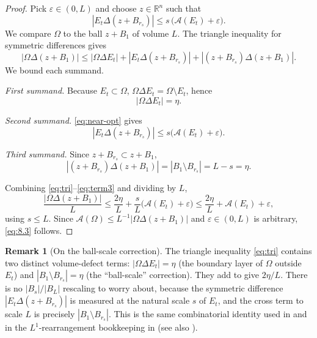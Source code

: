 \documentclass[11pt]{article}
\theoremstyle{definition}
\newtheorem{remark}[theorem]{Remark}
\newcommand{\R}{\mathbb{R}}
\newcommand{\Fr}{\mathcal{A}}
\newcommand{\Om}{\Omega}
\newcommand{\eps}{\varepsilon}
\begin{document}
\begin{proof}
Pick $\eps\in(0,L)$ and choose $z\in\R^n$ such that
\begin{equation}\label{eq:near-opt}
|E_t\Delta(z+B_{r_s})|\le s\,\bigl(\Fr(E_t)+\eps\bigr).
\end{equation}
We compare $\Om$ to the ball $z+B_1$ of volume $L$. The triangle
inequality for symmetric differences gives
\begin{equation}\label{eq:tri}
|\Om\Delta(z+B_1)|\le |\Om\Delta E_t|+|E_t\Delta(z+B_{r_s})|+|(z+B_{r_s})\Delta(z+B_1)|.
\end{equation}
We bound each summand.

\emph{First summand.} Because $E_t\subset\Om$,
$\Om\Delta E_t=\Om\setminus E_t$, hence
\begin{equation}\label{eq:term1}
|\Om\Delta E_t|=\eta.
\end{equation}

\emph{Second summand.} \eqref{eq:near-opt} gives
\begin{equation}\label{eq:term2}
|E_t\Delta(z+B_{r_s})|\le s\bigl(\Fr(E_t)+\eps\bigr).
\end{equation}

\emph{Third summand.} Since $z+B_{r_s}\subset z+B_1$,
\begin{equation}\label{eq:term3}
|(z+B_{r_s})\Delta(z+B_1)|=|B_1\setminus B_{r_s}|=L-s=\eta.
\end{equation}

Combining \eqref{eq:tri}--\eqref{eq:term3} and dividing by $L$,
\begin{equation}\label{eq:combine}
\frac{|\Om\Delta(z+B_1)|}{L}
\le \frac{2\eta}{L}+\frac{s}{L}\bigl(\Fr(E_t)+\eps\bigr)
\le \frac{2\eta}{L}+\Fr(E_t)+\eps,
\end{equation}
using $s\le L$. Since $\Fr(\Om)\le L^{-1}|\Om\Delta(z+B_1)|$ and
$\eps\in(0,L)$ is arbitrary, \eqref{eq:8.3} follows.
\end{proof}

\begin{remark}[On the ball-scale correction]
\label{rem:ball-scale}
The triangle inequality \eqref{eq:tri} contains two distinct
volume-defect terms: $|\Om\Delta E_t|=\eta$ (the boundary layer of
$\Om$ outside $E_t$) and $|B_1\setminus B_{r_s}|=\eta$ (the
``ball-scale'' correction). They add to give $2\eta/L$. There is no
$|B_s|/|B_L|$ rescaling to worry about, because the symmetric
difference $|E_t\Delta(z+B_{r_s})|$ is measured at the natural scale
$s$ of $E_t$, and the cross term to scale $L$ is precisely
$|B_1\setminus B_{r_s}|$. This is the same combinatorial identity
used in \cite[Lemma~8.3]{LevelSetIdentity} and in the
$L^1$-rearrangement bookkeeping in \cite{Maggi2012}
(see also \cite{FigalliMaggi2011}).
\end{remark}
\end{document}
